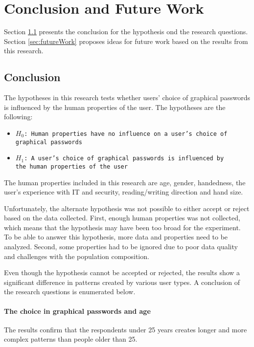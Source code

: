 \chapter{Conclusion and Future Work}\label{chap:conclusion}
  

  Section \ref{sec:conclusion} presents the conclusion for the hypothesis ond the research questions. Section \ref{sec:futureWork} proposes ideas for future work based on the results from this research. 

  \clearpage
  \section{Conclusion}\label{sec:conclusion}
    

The hypotheses in this research tests whether users' choice of graphical passwords is influenced by the human properties of the user. The hypotheses are the following:

    {\renewcommand\labelitemi{}
          \begin{itemize}
            \item \texttt{$H_{0}$: Human properties have no influence on a user's choice of \\graphical passwords}
            \item \texttt{$H_{1}$: A user's choice of graphical passwords is influenced by \\the human properties of the user}
          \end{itemize}
        }

The human properties included in this research are age, gender, handedness, the user's experience with IT and security, reading/writing direction and hand size. 

Unfortunately, the alternate hypothesis was not possible to either accept or reject based on the data collected. First, enough human properties was not collected, which means that the hypothesis may have been too broad for the experiment. To be able to answer this hypothesis, more data and properties need to be analyzed. Second, some properties had to be ignored due to poor data quality and challenges with the population composition. 

Even though the hypothesis cannot be accepted or rejected, the results show a significant difference in patterns created by various user types. A conclusion of the research questions is enumerated below. 

\subsubsection*{The choice in graphical passwords and age}
The results confirm that the respondents under 25 years creates longer and more complex patterns than people older than 25.

